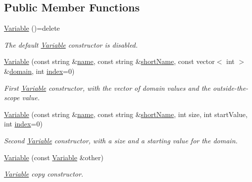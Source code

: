 \subsection*{Public Member Functions}
\begin{DoxyCompactItemize}
\item 
\hyperlink{classghost_1_1Variable_a41d27734b85f60c2e5fda7ee0ab5c600}{Variable} ()=delete
\begin{DoxyCompactList}\small\item\em The default \hyperlink{classghost_1_1Variable}{Variable} constructor is disabled. \end{DoxyCompactList}\item 
\hyperlink{classghost_1_1Variable_aa5dc881b8a239206bf55d018cc4a2156}{Variable} (const string \&\hyperlink{classghost_1_1Variable_a05cf4a4cd3a5c033028e0b0f11d1dafd}{name}, const string \&\hyperlink{classghost_1_1Variable_afb5eb79a7f6351b4305fe082699b6d7d}{short\-Name}, const vector$<$ int $>$ \&\hyperlink{classghost_1_1Variable_ab3d7bfa2e8c2139473775a6b797d0991}{domain}, int \hyperlink{classghost_1_1Variable_a934efa463fb1897b4266040e321dbc41}{index}=0)
\begin{DoxyCompactList}\small\item\em First \hyperlink{classghost_1_1Variable}{Variable} constructor, with the vector of domain values and the outside-\/the-\/scope value. \end{DoxyCompactList}\item 
\hyperlink{classghost_1_1Variable_a98be1149bd927b36a7914756641d6196}{Variable} (const string \&\hyperlink{classghost_1_1Variable_a05cf4a4cd3a5c033028e0b0f11d1dafd}{name}, const string \&\hyperlink{classghost_1_1Variable_afb5eb79a7f6351b4305fe082699b6d7d}{short\-Name}, int size, int start\-Value, int \hyperlink{classghost_1_1Variable_a934efa463fb1897b4266040e321dbc41}{index}=0)
\begin{DoxyCompactList}\small\item\em Second \hyperlink{classghost_1_1Variable}{Variable} constructor, with a size and a starting value for the domain. \end{DoxyCompactList}\item 
\hyperlink{classghost_1_1Variable_ac9fb0513e1d15a047816821e034589ea}{Variable} (const \hyperlink{classghost_1_1Variable}{Variable} \&other)
\begin{DoxyCompactList}\small\item\em \hyperlink{classghost_1_1Variable}{Variable} copy constructor. \end{DoxyCompactList}\item 

\end{DoxyCompactItemize}

